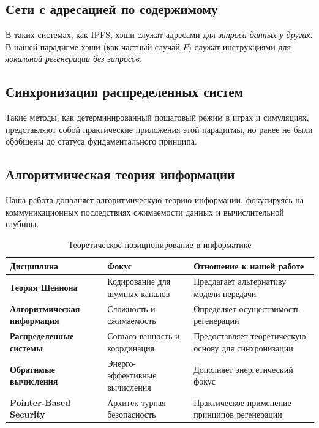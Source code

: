\documentclass[11pt,a4paper]{article}
\begin{document}
\subsection{Сети с адресацией по содержимому}

В таких системах, как IPFS, хэши служат адресами для \emph{запроса данных у других}. В нашей парадигме хэши (как частный случай $P$) служат инструкциями для \emph{локальной регенерации без запросов}.

\subsection{Синхронизация распределенных систем}

Такие методы, как детерминированный пошаговый режим в играх и симуляциях, представляют собой практические приложения этой парадигмы, но ранее не были обобщены до статуса фундаментального принципа.

\subsection{Алгоритмическая теория информации}

Наша работа дополняет алгоритмическую теорию информации, фокусируясь на коммуникационных последствиях сжимаемости данных и вычислительной глубины.

\begin{table}[h]
\centering
\caption{Теоретическое позиционирование в информатике}
\begin{tabularx}{\textwidth}{|l|X|X|}
\hline
\textbf{Дисциплина} & \textbf{Фокус} & \textbf{Отношение к нашей работе} \\
\hline
\textbf{Теория Шеннона} & Кодирование для шумных каналов & Предлагает альтернативу модели передачи \\
\hline
\textbf{Алгоритмическая информация} & Сложность и сжимаемость & Определяет осуществимость регенерации \\
\hline
\textbf{Распределенные системы} & Согласо-ванность и координация & Предоставляет теоретическую основу для синхронизации \\
\hline
\textbf{Обратимые вычисления} & Энерго-эффективные вычисления & Дополняет энергетический фокус \\
\hline
\textbf{Pointer-Based Security} & Архитек-турная безопасность & Практическое применение принципов регенерации \\
\hline
\end{tabularx}
\end{table}
\end{document}
